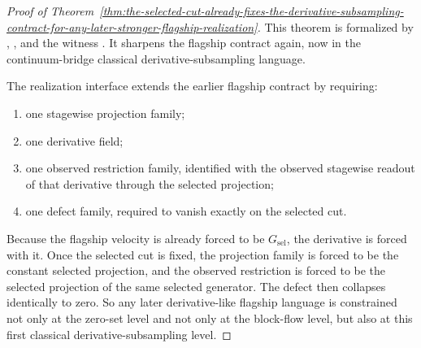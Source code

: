 \begin{proof}[Proof of Theorem~\ref{thm:the-selected-cut-already-fixes-the-derivative-subsampling-contract-for-any-later-stronger-flagship-realization}]
\label{proof:thm:the-selected-cut-already-fixes-the-derivative-subsampling-contract-for-any-later-stronger-flagship-realization}
This theorem is formalized by
,
, and the
witness
.
It sharpens the flagship contract again, now in the continuum-bridge classical
derivative-subsampling language.

The realization interface extends the earlier flagship contract by requiring:
\begin{enumerate}
\item one stagewise projection family;
\item one derivative field;
\item one observed restriction family, identified with the observed stagewise
      readout of that derivative through the selected projection;
\item one defect family, required to vanish exactly on the selected cut.
\end{enumerate}
Because the flagship velocity is already forced to be \(G_{\mathrm{sel}}\),
the derivative is forced with it. Once the selected cut is fixed, the
projection family is forced to be the constant selected projection, and the
observed restriction is forced to be the selected projection of the same
selected generator. The defect then collapses identically to zero. So any
later derivative-like flagship language is constrained not only at the
zero-set level and not only at the block-flow level, but also at this first
classical derivative-subsampling level.
\end{proof}

